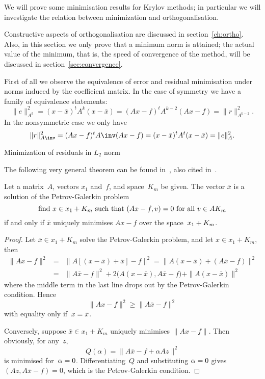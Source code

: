 We will prove some minimisation results for Krylov methods; in particular
we will investigate the relation between minimization and orthogonalisation.
\begin{truth}
Constructive aspects of orthogonalisation are discussed in 
section~\ref{ch:ortho}. Also, in this section we only prove that a
minimum norm is attained; the actual value of the minimum, that is,
the speed of convergence of the method, will be
discussed in section~\ref{sec:convergence}.
\end{truth}

First of all we observe the equivalence
of error and residual minimisation 
under norms induced by the coefficient matrix.
In the case of symmetry we have a family of equivalence statements:
\[ \|e\|_{A^k}^2=(x-\bar x)^tA^k(x-\bar x)=(Ax-f)^tA^{k-2}(Ax-f)
    =\|r\|_{A^{k-2}}^2.\]
In the nonsymmetric case we only have
\[ \|r\|_{A\inv}^2=(Ax-f)^tA\inv(Ax-f)=(x-\bar x)^tA^t(x-\bar x)=\|e\|^2_A. \]

 {Minimization of residuals in $L_2$ norm}
\label{sec:abstract-true-min}

The following very general theorem can be found in~\cite{Krasnoselskii:1972},
also cited in~\cite{SaadSchultz:cg-like}.

\begin{theorem}\label{th:petrov-galerkin}
Let a matrix~$A$, vectors $x_1$ and~$f$, and space~$K_m$ be given.
The vector $\bar x$ is a solution of the Petrov-Galerkin problem
\[ \hbox{find $x\in x_1+K_m$ such that $(Ax-f,v)=0$ for all $v\in AK_m$} \]
if and only if $\bar x$ uniquely
minimises $Ax-f$ over the space~$x_1+\nobreak K_m$.
\end{theorem}

\begin{proof} Let $\bar x\in x_1+K_m$ solve the Petrov-Galerkin problem,
and let $x\in x_1+ K_m$, then
\begin{eqnarray}
    \|Ax-f\|^2 &=& \|A[(x-\bar x)+\bar x]-f\|^2 
        = \|A(x-\bar x)+(A\bar x-f)\|^2\nonumber \\
    &=& \|A\bar x-f\|^2 +2\bigl(A(x-\bar x),A\bar x-f) +
                \|A(x-\bar x)\|^2 \label{eq:pg-writeout}
\end{eqnarray}
where the middle term in the last line drops out by the 
Petrov-Galerkin condition. Hence
\[ \|Ax-f\|^2 \geq \|A\bar x-f\|^2 \]
with equality only if~$x=\nobreak \bar x$.

Conversely, suppose $\bar x\in x_1+K_m$ uniquely minimises $\|Ax-f\|$.
Then obviously, for any~$z$,
\[ Q(\alpha) = \|A\bar x-f+\alpha Az\|^2 \]
is minimised for~$\alpha=\nobreak0$. Differentiating~$Q$ and
substituting $\alpha=\nobreak0$ gives $(Az,A\bar x-f)=0$,
which is the Petrov-Galerkin condition.
\end{proof}

